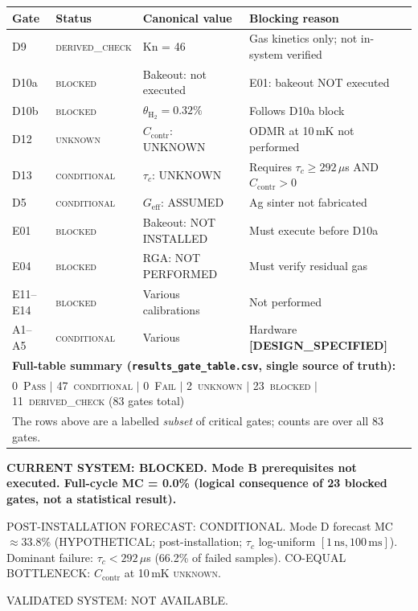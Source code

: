 \documentclass[12pt,a4paper]{article}
\newcommand{\blocked}{\textsc{blocked}}
\newcommand{\conditional}{\textsc{conditional}}
\newcommand{\derivedcheck}{\textsc{derived\_check}}
\newcommand{\unknown}{\textsc{unknown}}
\newcommand{\designspec}{\textbf{[DESIGN\_SPECIFIED]}}
\newcommand{\verdictbox}[1]{%
  \vspace{0.5em}\par
  \noindent\colorbox{yellow!30}{\parbox{\dimexpr\linewidth-2\fboxsep}{\bfseries #1}}\par
  \vspace{0.5em}
}
\begin{document}
\begin{center}
\small
\begin{longtable}{lllp{6cm}}
\toprule
Gate & Status & Canonical value & Blocking reason \\
\midrule
D9 & \derivedcheck{} & Kn = 46 & Gas kinetics only; not in-system verified \\
D10a & \blocked{} & Bakeout: not executed & E01: bakeout NOT executed \\
D10b & \blocked{} & $\theta_\mathrm{H_2}=0.32\%$ & Follows D10a block \\
D12 & \unknown{} & $C_\mathrm{contr}$: UNKNOWN & ODMR at 10\,mK not performed \\
D13 & \conditional{} & $\tau_c$: UNKNOWN & Requires $\tau_c\geq292\,\mu$s AND $C_\mathrm{contr}>0$ \\
D5 & \conditional{} & $G_\mathrm{eff}$: ASSUMED & Ag sinter not fabricated \\
E01 & \blocked{} & Bakeout: NOT INSTALLED & Must execute before D10a \\
E04 & \blocked{} & RGA: NOT PERFORMED & Must verify residual gas \\
E11--E14 & \blocked{} & Various calibrations & Not performed \\
A1--A5 & \conditional{} & Various & Hardware \designspec{} \\
\midrule
\multicolumn{4}{l}{\textbf{Full-table summary (\texttt{results\_gate\_table.csv}, single source of truth):}} \\
\multicolumn{4}{l}{0~\textsc{Pass} $|$ 47~\conditional{} $|$ 0~\textsc{Fail} $|$ 2~\unknown{} $|$ 23~\blocked{} $|$ 11~\derivedcheck{} \quad(83 gates total)} \\
\multicolumn{4}{l}{\footnotesize The rows above are a labelled \emph{subset} of critical gates; counts are over all 83 gates.} \\
\bottomrule
\end{longtable}
\end{center}

\verdictbox{CURRENT SYSTEM: BLOCKED. Mode B prerequisites not executed.
Full-cycle MC = 0.0\% (logical consequence of 23 blocked gates, not a statistical result).

POST-INSTALLATION FORECAST: CONDITIONAL.
Mode D forecast MC $\approx 33.8\%$ (HYPOTHETICAL; post-installation; $\tau_c$ log-uniform $[1\,\mathrm{ns}, 100\,\mathrm{ms}]$).
Dominant failure: $\tau_c < 292\,\mu$s (66.2\% of failed samples).
CO-EQUAL BOTTLENECK: $C_\mathrm{contr}$ at 10\,mK \unknown{}.

VALIDATED SYSTEM: NOT AVAILABLE.}
\end{document}
